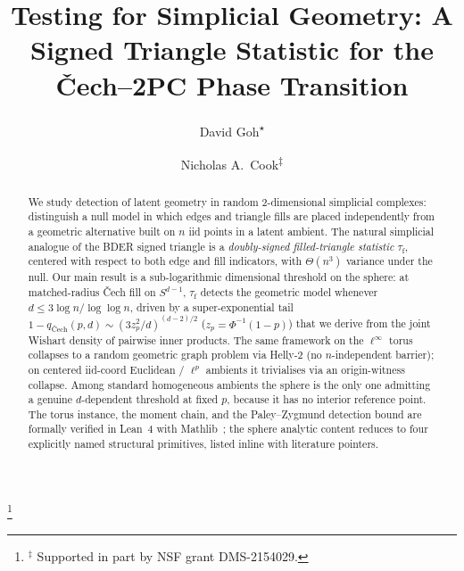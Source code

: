 \documentclass[reqno,12pt]{amsart}
\newcommand{\tauf}{\tau_{\mathrm{f}}}
\theoremstyle{plain}
\theoremstyle{definition}
\theoremstyle{remark}
\begin{document}
\title[Testing for Simplicial Geometry]{Testing for Simplicial Geometry: A Signed Triangle
  Statistic for the \v{C}ech--2PC Phase Transition}

\author[Goh and Cook]{David Goh\textsuperscript{$\star$}}
\address{\textsuperscript{$\star$}Department of Computer Science, University of Toronto}

\author{Nicholas A.\ Cook\textsuperscript{$\ddagger$}}
\thanks{${}^{\ddagger}$ Supported in part by NSF grant DMS-2154029.}
\address{\textsuperscript{$\ddagger$}Department of Mathematics, Duke University, Durham, NC, USA}

\date{}



\begin{abstract}
We study detection of latent geometry in random 2-dimensional simplicial complexes:
distinguish a null model in which edges and triangle fills are placed independently from
a geometric alternative built on $n$ iid points in a latent ambient. The natural
simplicial analogue of the BDER signed triangle is a \emph{doubly-signed filled-triangle
statistic} $\tauf$, centered with respect to both edge and fill indicators, with
$\Theta(n^3)$ variance under the null. Our main result is a sub-logarithmic dimensional
threshold on the sphere: at matched-radius \v{C}ech fill on $S^{d-1}$, $\tauf$ detects
the geometric model whenever $d \le 3\log n / \log\log n$, driven by a super-exponential
tail $1 - q_{\text{\v{C}ech}}(p,d) \sim (3 z_p^2/d)^{(d-2)/2}$ ($z_p = \Phi^{-1}(1-p)$)
that we derive from the joint Wishart density of pairwise inner products. The same
framework on the $\ell^\infty$ torus collapses to a random geometric graph problem via
Helly-2 (no $n$-independent barrier); on centered iid-coord Euclidean / $\ell^p$
ambients it trivialises via an origin-witness collapse. Among standard homogeneous
ambients the sphere is the only one admitting a genuine $d$-dependent threshold at fixed
$p$, because it has no interior reference point. The torus instance, the moment chain,
and the Paley--Zygmund detection bound are formally verified in Lean~4 with
Mathlib~\cite{Mathlib2020}; the sphere analytic content reduces to four explicitly named
structural primitives, listed inline with literature pointers.
\end{abstract}
\end{document}
